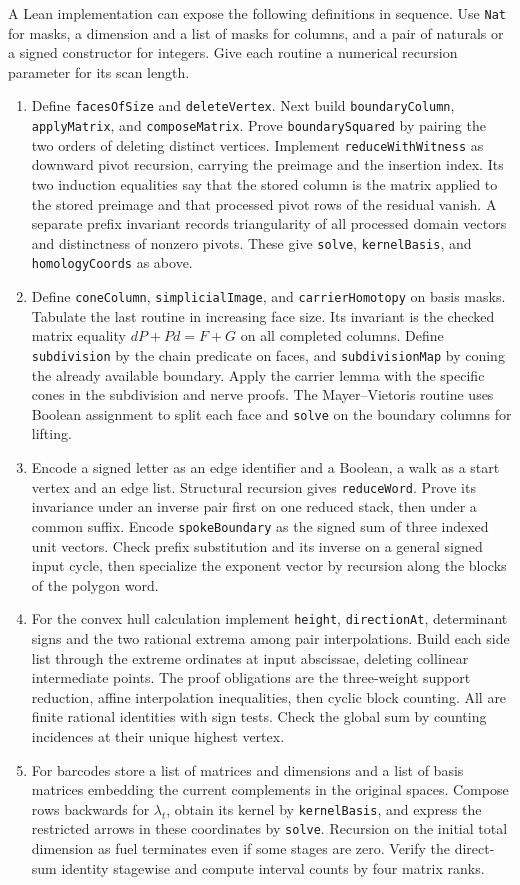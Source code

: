 A Lean implementation can expose the following definitions in sequence.
Use \texttt{Nat} for masks, a dimension and a list of masks for columns,
and a pair of naturals or a signed constructor for integers. Give each
routine a numerical recursion parameter for its scan length.
\begin{enumerate}
\item Define \texttt{facesOfSize} and \texttt{deleteVertex}. Next build
\texttt{boundaryColumn}, \texttt{applyMatrix}, and
\texttt{composeMatrix}. Prove \texttt{boundarySquared} by pairing the
two orders of deleting distinct vertices. Implement
\texttt{reduceWithWitness} as downward pivot recursion, carrying the
preimage and the insertion index. Its two induction equalities say
that the stored column is the matrix applied to the stored preimage and
that processed pivot rows of the residual vanish. A separate prefix
invariant records triangularity of all processed domain vectors and
distinctness of nonzero pivots. These give \texttt{solve},
\texttt{kernelBasis}, and \texttt{homologyCoords} as above.
\item Define \texttt{coneColumn}, \texttt{simplicialImage}, and
\texttt{carrierHomotopy} on basis masks. Tabulate the last routine
in increasing face size. Its invariant is the checked matrix equality
$dP+Pd=F+G$ on all completed columns. Define \texttt{subdivision}
by the chain predicate on faces, and \texttt{subdivisionMap} by coning
the already available boundary. Apply the carrier lemma with the specific
cones in the subdivision and nerve proofs. The Mayer--Vietoris routine
uses Boolean assignment to split each face and \texttt{solve} on the
boundary columns for lifting.
\item Encode a signed letter as an edge identifier and a Boolean,
a walk as a start vertex and an edge list. Structural recursion gives
\texttt{reduceWord}. Prove its invariance under an inverse pair first on
one reduced stack, then under a common suffix. Encode \texttt{spokeBoundary}
as the signed sum of three indexed unit vectors. Check prefix substitution
and its inverse on a general signed input cycle, then specialize the
exponent vector by recursion along the blocks of the polygon word.
\item For the convex hull calculation implement \texttt{height},
\texttt{directionAt}, determinant signs and the two rational extrema
among pair interpolations. Build each side list through the extreme
ordinates at input abscissae, deleting collinear intermediate points.
The proof obligations are the three-weight support reduction, affine
interpolation inequalities, then cyclic block counting. All are finite
rational identities with sign tests. Check the global sum by counting
incidences at their unique highest vertex.
\item For barcodes store a list of matrices and dimensions and a list of
basis matrices embedding the current complements in the original
spaces. Compose rows backwards for $\lambda_t$, obtain its kernel by
\texttt{kernelBasis}, and express the restricted arrows in these
coordinates by \texttt{solve}. Recursion on the initial total dimension
as fuel terminates even if some stages are zero. Verify the direct-sum
identity stagewise and compute interval counts by four matrix ranks.
\end{enumerate}
